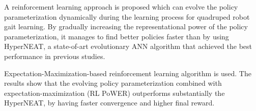 A reinforcement learning approach is proposed
which can evolve the policy parameterization dynamically during
the learning process for quadruped robot gait learning. By gradually increasing the representational
power of the policy parameterization, it manages to find better
policies faster than by using HyperNEAT, a state-of-art evolutionary ANN algorithm that achieved the best performance in previous studies.

Expectation-Maximization-based reinforcement learning algorithm
is used. The results show that the evolving policy parameterization combined with expectation-maximization (RL PoWER)
outperforms substantially the HyperNEAT, by having
faster convergence and higher final
reward.
